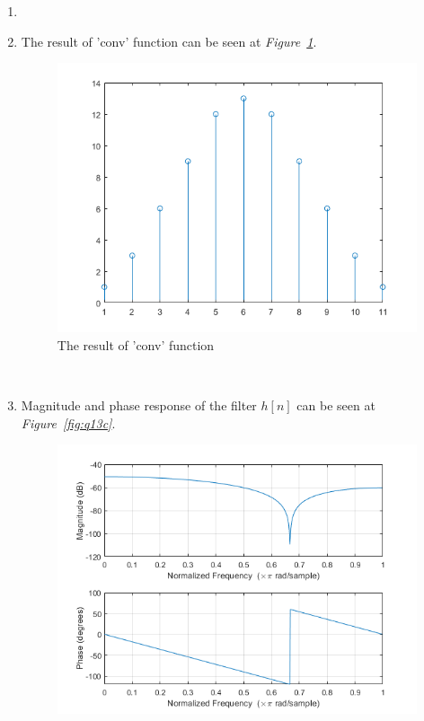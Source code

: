 \documentclass[a4paper,12pt]{article}
\begin{document}
\begin{enumerate}
		\begin{enumerate}
			\item 
			\item  The result of 'conv' function can be seen at \textit{Figure~\ref{fig:q13b2}}.
				\begin{figure}[H]
					\centering
					\setlength{\unitlength}{\textwidth} 
					\includegraphics[width=0.6\unitlength]{q13b2}
					\caption{\label{fig:q13b2} The result of 'conv' function  }
				\end{figure}  \-\\
				
			\item Magnitude and phase response of the filter $h[n]$ can be seen at \textit{Figure~\ref{fig:q13c}}.
				\begin{figure}[H]
					\centering
					\setlength{\unitlength}{\textwidth} 
					\includegraphics[width=0.9\unitlength]{q13c}

\end{figure}
\end{enumerate}
\end{enumerate}
\end{document}
